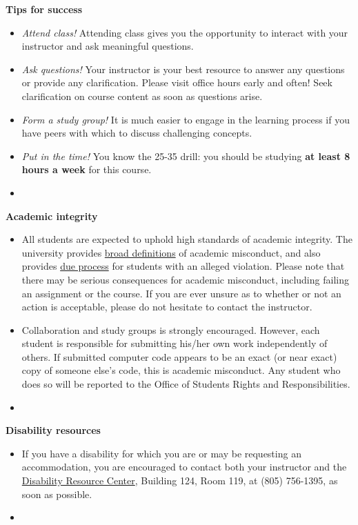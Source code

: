 \documentclass[letterpaper,12pt]{report}
\begin{document}
\textbf{Tips for success}
\begin{itemize}
\item \emph{Attend class!}  Attending class gives you the opportunity to interact with your instructor and ask meaningful questions.
\item \emph{Ask questions!} Your instructor is your best resource to answer any questions or provide any clarification. Please visit office hours early and often!  Seek clarification on course content as soon as questions arise.
\item \emph{Form a study group!} It is much easier to engage in the learning process if you have peers with which to discuss challenging concepts.
 \item \emph{Put in the time!}  You know the 25-35 drill: you should be studying \textbf{at least 8 hours a week} for this course.
\item[]
\end{itemize}

\textbf{Academic integrity}
\begin{itemize}
\item[]
All students are expected to uphold high standards of academic integrity. The university provides \href{http://www.academicprograms.calpoly.edu/content/academicpolicies/Cheating}{broad definitions} of academic misconduct, and also provides \href{http://www.osrr.calpoly.edu/process}{due process} for students with an alleged violation.  Please note that there may be serious consequences for academic misconduct, including failing an assignment or the course. If you are ever unsure as to whether or not an action is acceptable, please do not hesitate to contact the instructor.
\item[]
Collaboration and study groups is strongly encouraged.  However, each student is responsible for submitting his/her own work independently of others.  If submitted computer code appears to be an exact (or near exact) copy of someone else's code, this is academic misconduct.  Any student who does so will be reported to the Office of Students Rights and Responsibilities.
\item[]
\end{itemize}

\clearpage
\textbf{Disability resources}
\begin{itemize}
\item[]
If you have a disability for which you are or may be requesting an accommodation, you are encouraged to contact both your instructor and the \href{http://drc.calpoly.edu/}{Disability Resource Center}, Building 124, Room 119, at (805) 756-1395, as soon as possible.
\item[]
\end{itemize}
\end{document}
